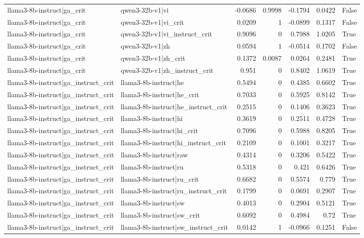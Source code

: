 \begin{table}
\begin{tabular}{l l r r r r l}
llama3-8b-instruct|ga_crit & qwen3-32b-v1|vi & -0.0686 & 0.9998 & -0.1794 & 0.0422 & False \\
llama3-8b-instruct|ga_crit & qwen3-32b-v1|vi_crit & 0.0209 & 1 & -0.0899 & 0.1317 & False \\
llama3-8b-instruct|ga_crit & qwen3-32b-v1|vi_instruct_crit & 0.9096 & 0 & 0.7988 & 1.0205 & True \\
llama3-8b-instruct|ga_crit & qwen3-32b-v1|zh & 0.0594 & 1 & -0.0514 & 0.1702 & False \\
llama3-8b-instruct|ga_crit & qwen3-32b-v1|zh_crit & 0.1372 & 0.0087 & 0.0264 & 0.2481 & True \\
llama3-8b-instruct|ga_crit & qwen3-32b-v1|zh_instruct_crit & 0.951 & 0 & 0.8402 & 1.0619 & True \\
llama3-8b-instruct|ga_instruct_crit & llama3-8b-instruct|he & 0.5494 & 0 & 0.4385 & 0.6602 & True \\
llama3-8b-instruct|ga_instruct_crit & llama3-8b-instruct|he_crit & 0.7033 & 0 & 0.5925 & 0.8142 & True \\
llama3-8b-instruct|ga_instruct_crit & llama3-8b-instruct|he_instruct_crit & 0.2515 & 0 & 0.1406 & 0.3623 & True \\
llama3-8b-instruct|ga_instruct_crit & llama3-8b-instruct|hi & 0.3619 & 0 & 0.2511 & 0.4728 & True \\
llama3-8b-instruct|ga_instruct_crit & llama3-8b-instruct|hi_crit & 0.7096 & 0 & 0.5988 & 0.8205 & True \\
llama3-8b-instruct|ga_instruct_crit & llama3-8b-instruct|hi_instruct_crit & 0.2109 & 0 & 0.1001 & 0.3217 & True \\
llama3-8b-instruct|ga_instruct_crit & llama3-8b-instruct|raw & 0.4314 & 0 & 0.3206 & 0.5422 & True \\
llama3-8b-instruct|ga_instruct_crit & llama3-8b-instruct|ru & 0.5318 & 0 & 0.421 & 0.6426 & True \\
llama3-8b-instruct|ga_instruct_crit & llama3-8b-instruct|ru_crit & 0.6682 & 0 & 0.5574 & 0.779 & True \\
llama3-8b-instruct|ga_instruct_crit & llama3-8b-instruct|ru_instruct_crit & 0.1799 & 0 & 0.0691 & 0.2907 & True \\
llama3-8b-instruct|ga_instruct_crit & llama3-8b-instruct|sw & 0.4013 & 0 & 0.2904 & 0.5121 & True \\
llama3-8b-instruct|ga_instruct_crit & llama3-8b-instruct|sw_crit & 0.6092 & 0 & 0.4984 & 0.72 & True \\
llama3-8b-instruct|ga_instruct_crit & llama3-8b-instruct|sw_instruct_crit & 0.0142 & 1 & -0.0966 & 0.1251 & False \\

\end{tabular}
\end{table}
